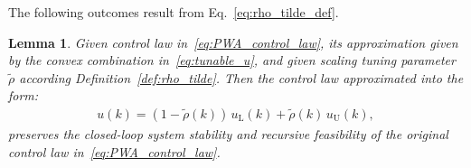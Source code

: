 \documentclass[preprint,12pt]{elsarticle}
\newtheorem{lemma}{Lemma}[theorem]
\newtheorem{corollary}{Corollary}[theorem]
\begin{document}
	The following outcomes result from Eq.~\eqref{eq:rho_tilde_def}. 
	\begin{lemma}
		\label{lem:PWA_control_law_interval}
		Given control law in~\eqref{eq:PWA_control_law}, its approximation given by the convex combination in~\eqref{eq:tunable_u}, and given scaling tuning parameter $\widetilde{\rho}$ according Definition~\ref{def:rho_tilde}. Then the control law  approximated into the form:
		\begin{eqnarray}
			\label{eq:PWA_control_law_interval}
			u(k) = (1-\widetilde{\rho}(k)) \, u_\mathrm{L}(k) + \widetilde{\rho}(k) \, u_\mathrm{U}(k),
		\end{eqnarray}
		preserves the closed-loop system stability and recursive feasibility of the original control law in~\eqref{eq:PWA_control_law}.
	\end{lemma}
	
\end{document}

